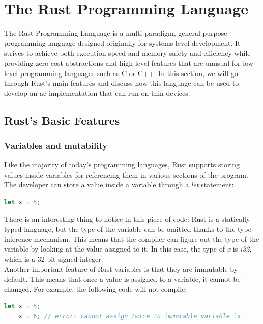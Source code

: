 \section{The Rust Programming Language}
The Rust Programming Language is a multi-paradigm, general-purpose programming language designed originally for systems-level development. It strives to achieve both execution
speed and memory safety and efficiency while providing zero-cost abstractions and high-level features that are unusual for low-level programming languages such as C or C++.
In this section, we will go through Rust's main features and discuss how this language can be used to develop an \acs{ac} implementation that can run on thin devices.

\subsection{Rust's Basic Features}
\subsubsection{Variables and mutability}
Like the majority of today's programming languages, Rust supports storing values inside variables for referencing them in various sections of the program. \\
The developer can store a value inside a variable through a \textit{let} statement:

\begin{lstlisting}[language=Rust]
    let x = 5;
\end{lstlisting}

There is an interesting thing to notice in this piece of code: Rust is a statically typed language, but the type of the variable can be omitted thanks to the type inference mechanism. This means that the compiler can figure out the type of the variable by looking at the value assigned to it. In this case, the type of \textit{x} is \textit{i32}, which is a 32-bit signed integer. \\

Another important feature of Rust variables is that they are immutable by default. This means that once a value is assigned to a variable, it cannot be changed.
For example, the following code will not compile:

\begin{lstlisting}[language=Rust]
    let x = 5;
    x = 6; // error: cannot assign twice to immutable variable `x`
\end{lstlisting}

